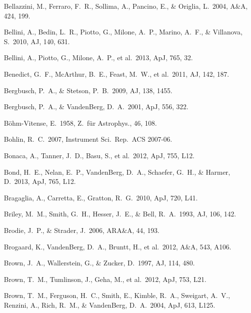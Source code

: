 \documentclass[12pt,preprint]{aastex}
\begin{document}
\begin{thebibliography}{}
Bellazzini, M., Ferraro, F.~R., Sollima, A., Pancino, E., \& Origlia,
 L.~2004, A\&A, 424, 199.

Bellini, A., Bedin, L.~R., Piotto, G., Milone, A.~P., Marino, A.~F., \&
 Villanova, S.~2010, AJ, 140, 631.

Bellini, A., Piotto, G., Milone, A.~P., et al.~2013, ApJ, 765, 32.

Benedict, G.~F., McArthur, B.~E., Feast, M.~W., et al.~2011, AJ, 142, 187.

%
Bergbusch, P.~A., \& Stetson, P.~B.~2009, AJ, 138, 1455.

Bergbusch, P.~A., \& VandenBerg, D.~A.~2001, ApJ, 556, 322.

B\"ohm-Vitense, E.~1958, Z.~f\"ur Astrophys., 46, 108.

Bohlin, R.~C.~2007, Instrument Sci.~Rep.~ACS 2007-06.

Bonaca, A., Tanner, J.~D., Basu, S., et al.~2012, ApJ, 755, L12.

Bond, H.~E., Nelan, E.~P., VandenBerg, D.~A., Schaefer, G.~H., \& Harmer,
 D.~2013, ApJ, 765, L12.

Bragaglia, A., Carretta, E., Gratton, R.~G.~2010, ApJ, 720, L41.

Briley, M.~M., Smith, G.~H., Hesser, J.~E., \& Bell, R.~A.~1993, AJ, 106, 142.

Brodie, J.~P., \& Strader, J.~2006, ARA\&A, 44, 193.

Brogaard, K., VandenBerg, D.~A., Bruntt, H., et al.~2012, A\&A, 543, A106.

Brown, J.~A., Wallerstein, G., \& Zucker, D.~1997, AJ, 114, 480.

Brown, T.~M., Tumlinson, J., Geha, M., et al.~2012, ApJ, 753, L21.

Brown, T.~M., Ferguson, H.~C., Smith, E., Kimble, R.~A., Sweigart, A.~V.,
 Renzini, A., Rich, R.~M., \& VandenBerg, D.~A.~2004, ApJ, 613, L125.


\end{thebibliography}
\end{document}
